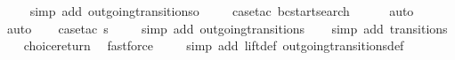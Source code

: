 \begin{isabellebody}
\ \ \ \isamarkupfalse%
\ {\isacharparenleft}simp\ add{\isacharcolon}\ outgoing{\isacharunderscore}transitions{\isacharunderscore}o{\isacharparenright}\isanewline
\ \ \ \isamarkupfalse%
\ {\isacharparenleft}case{\isacharunderscore}tac\ {\isachardoublequoteopen}bc{\isacharequal}startsearch{\isachardoublequoteclose}{\isacharparenright}\isanewline
\ \ \ \ \isamarkupfalse%
\ auto{\isacharbrackleft}{}{\isacharbrackright}\isanewline
\ \ \ \isamarkupfalse%
\ auto{\isacharbrackleft}{}{\isacharbrackright}\isanewline
\isanewline
\ \ \isamarkupfalse%
\ {\isacharparenleft}case{\isacharunderscore}tac\ {\isachardoublequoteopen}s{\isacharequal}{}{\isachardoublequoteclose}{\isacharparenright}\isanewline
\ \ \ \isamarkupfalse%
\ {\isacharparenleft}simp\ add{\isacharcolon}\ outgoing{\isacharunderscore}transitions{\isacharunderscore}{}{\isacharparenright}\isanewline
\ \ \isamarkupfalse%
\ {\isacharparenleft}simp\ add{\isacharcolon}\ transitions{\isacharparenright}\isanewline
\ \ \isamarkupfalse%
\ choice{\isacharunderscore}return\ \isamarkupfalse%
\ fastforce\ \isanewline
\ \ \isamarkupfalse%
\ {\isacharparenleft}simp\ add{\isacharcolon}\ lift{\isacharunderscore}def\ outgoing{\isacharunderscore}transitions{\isacharunderscore}def{\isacharparenright}%
\endisatagproof
{\isafoldproof}%
%
\isadelimproof
\isanewline
%
\endisadelimproof
%
\isadelimtheory
\isanewline
%
\endisadelimtheory
%
\isatagtheory
{}\isamarkupfalse%
%
\endisatagtheory
{\isafoldtheory}%
%
\isadelimtheory
%
\endisadelimtheory
%
\end{isabellebody}%
\endinput
